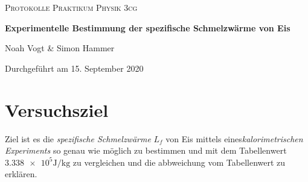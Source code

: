 \documentclass[a4 paper, 11pt]{article}
\begin{document}
\begin{titlepage}

\vspace*{1cm}
	\centering
	
	{\scshape\Large Protokolle Praktikum Physik 3cg \par}
	\vspace{0.5cm}
	{\huge\bfseries Experimentelle Bestimmung der spezifische Schmelzwärme von Eis\par}
	\vspace{0.5cm}
	{\Large Noah Vogt \& Simon Hammer\par}
	\vspace{0.5cm}

	{\large Durchgeführt am 15. September 2020\par}
	
\end{titlepage}

\tableofcontents
\pagebreak

\section{Versuchsziel}
Ziel ist es die \textit{spezifische Schmelzwärme} $L_f$ von Eis mittels eines\textit{kalorimetrischen Experiments} so genau wie möglich zu bestimmen und mit dem Tabellenwert $ \num{3.338 e5}\si{\J\per\kg} $ zu vergleichen und die abbweichung vom Tabellenwert zu erklären.
\end{document}
